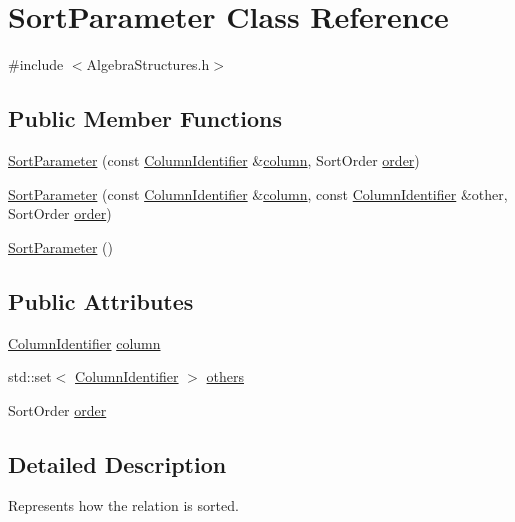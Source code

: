 \hypertarget{class_sort_parameter}{\section{Sort\+Parameter Class Reference}
\label{class_sort_parameter}
}


{\ttfamily \#include $<$Algebra\+Structures.\+h$>$}

\subsection*{Public Member Functions}
\begin{DoxyCompactItemize}
\item 
\hyperlink{class_sort_parameter_aef62c54532ba4260cdc41dfe6157db6b}{Sort\+Parameter} (const \hyperlink{class_column_identifier}{Column\+Identifier} \&\hyperlink{class_sort_parameter_a663fa509158e2230256acb4cee4657b9}{column}, Sort\+Order \hyperlink{class_sort_parameter_a768e8eeb0a9857820c1596ed50c0c13a}{order})
\item 
\hyperlink{class_sort_parameter_ae50120282e94b4918e1cf33dc1b9cc50}{Sort\+Parameter} (const \hyperlink{class_column_identifier}{Column\+Identifier} \&\hyperlink{class_sort_parameter_a663fa509158e2230256acb4cee4657b9}{column}, const \hyperlink{class_column_identifier}{Column\+Identifier} \&other, Sort\+Order \hyperlink{class_sort_parameter_a768e8eeb0a9857820c1596ed50c0c13a}{order})
\item 
\hyperlink{class_sort_parameter_a059b71791c331f735f453ce67ae2af23}{Sort\+Parameter} ()
\end{DoxyCompactItemize}
\subsection*{Public Attributes}
\begin{DoxyCompactItemize}
\item 
\hyperlink{class_column_identifier}{Column\+Identifier} \hyperlink{class_sort_parameter_a663fa509158e2230256acb4cee4657b9}{column}
\item 
std\+::set$<$ \hyperlink{class_column_identifier}{Column\+Identifier} $>$ \hyperlink{class_sort_parameter_ad898e5ea54ea4599db663b480af94cfd}{others}
\item 
Sort\+Order \hyperlink{class_sort_parameter_a768e8eeb0a9857820c1596ed50c0c13a}{order}
\end{DoxyCompactItemize}


\subsection{Detailed Description}
Represents how the relation is sorted. 

